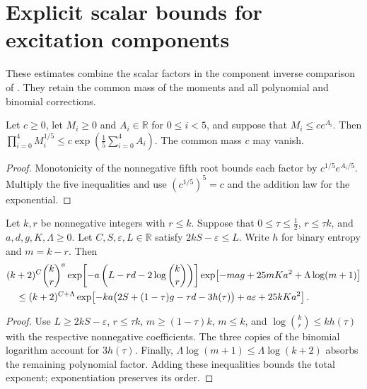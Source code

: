 \section{Explicit scalar bounds for excitation components}

These estimates combine the scalar factors in the component inverse
comparison of \cite[Section~8]{OpenAI2026AreaLaw}. They retain the
common mass of the moments and all polynomial and binomial corrections.

\begin{theorem}
  \label{thm:five_moment_common_mass}
  \leanok
  Let $c\geq0$, let $M_i\geq0$ and $A_i\in\mathbb R$ for
  $0\leq i<5$, and suppose that $M_i\leq c e^{A_i}$. Then
  $\prod_{i=0}^4M_i^{1/5}\leq c\exp(\frac15\sum_{i=0}^4A_i)$.
  The common mass $c$ may vanish.
\end{theorem}
\begin{proof}\leanok
  Monotonicity of the nonnegative fifth root bounds each factor by
  $c^{1/5}e^{A_i/5}$. Multiply the five inequalities and use
  $(c^{1/5})^5=c$ and the addition law for the exponential.
\end{proof}

\begin{theorem}
  \label{thm:replica_component_uniform_prefactor}
  \leanok
  Let $k,r$ be nonnegative integers with $r\leq k$. Suppose that
  $0\leq\tau\leq\frac12$, $r\leq\tau k$, and $a,d,g,K,\Lambda\geq0$.
  Let $C,S,\varepsilon,L\in\mathbb R$ satisfy $2kS-\varepsilon\leq L$.
  Write $h$ for binary entropy and $m=k-r$. Then
  \begin{align}
    &(k+2)^C\binom{k}{r}^{a}
      \exp\!\left[-a\left(L-rd-2\log\binom{k}{r}\right)\right]
      \exp\!\left[-mag+25mKa^2+\Lambda\log(m+1)\right]\notag\\
    &\quad\leq (k+2)^{C+\Lambda}
      \exp\!\left[-ka\bigl(2S+(1-\tau)g-\tau d-3h(\tau)\bigr)
        +a\varepsilon+25kKa^2\right].
  \end{align}
\end{theorem}
\begin{proof}\leanok
  Use $L\geq2kS-\varepsilon$, $r\leq\tau k$,
  $m\geq(1-\tau)k$, $m\leq k$, and
  $\log\binom{k}{r}\leq kh(\tau)$ with the respective nonnegative
  coefficients. The three copies of the binomial logarithm account
  for $3h(\tau)$. Finally,
  $\Lambda\log(m+1)\leq\Lambda\log(k+2)$ absorbs the remaining
  polynomial factor. Adding these inequalities bounds the total
  exponent; exponentiation preserves its order.
\end{proof}

